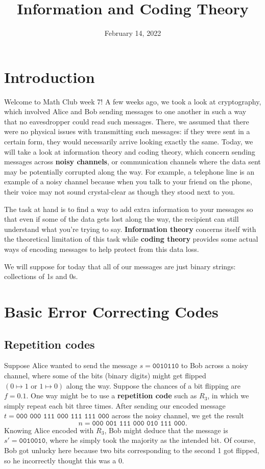 \documentclass{article}
\title{Information and Coding Theory}
\author{}
\date{February 14, 2022}
\begin{document}
\section{Introduction}

Welcome to Math Club week 7!
A few weeks ago, we took a look at cryptography, which involved Alice and Bob sending messages to one another in such a way that no eavesdropper could read such messages.
There, we assumed that there were no physical issues with transmitting such messages: if they were sent in a certain form, they would necessarily arrive looking exactly the same.
Today, we will take a look at information theory and coding theory, which concern sending messages across \textbf{noisy channels}, or communication channels where the data sent may be potentially corrupted along the way. 
For example, a telephone line is an example of a noisy channel because when you talk to your friend on the phone, their voice may not sound crystal-clear as though they stood next to you.

The task at hand is to find a way to add extra information to your messages so that even if some of the data gets lost along the way, the recipient can still understand what you're trying to say. 
\textbf{Information theory} concerns itself with the theoretical limitation of this task while \textbf{coding theory} provides some actual ways of encoding messages to help protect from this data loss.

We will suppose for today that all of our messages are just binary strings: collections of 1s and 0s.

\section{Basic Error Correcting Codes}

\subsection{Repetition codes}

Suppose Alice wanted to send the message \(s = \texttt{0010110}\) to Bob across a noisy channel, where some of the bits (binary digits) might get flipped \((0\mapsto 1\textrm{ or }1\mapsto 0)\) along the way.
Suppose the chances of a bit flipping are \(f=0.1\).
One way might be to use a \textbf{repetition code} such as \(R_3\), in which we simply repeat each bit three times.
After sending our encoded message \(t = \texttt{000 000 111 000 111 111 000}\) across the noisy channel, we get the result
\[n = \texttt{000 001 111 000 010 111 000}.\]
Knowing Alice encoded with \(R_3\), Bob might deduce that the message is \(s' = \texttt{0010010}\), where he simply took the majority as the intended bit. 
Of course, Bob got unlucky here because two bits corresponding to the second 1 got flipped, so he incorrectly thought this was a 0.
\end{document}
